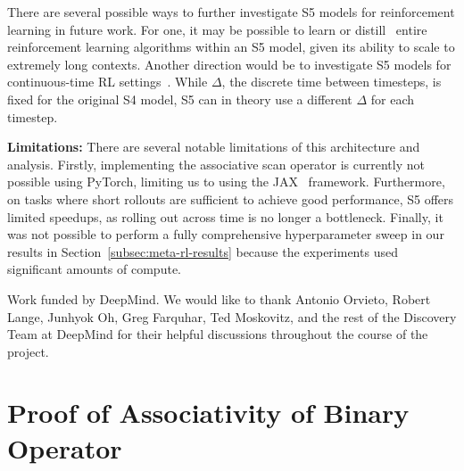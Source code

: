 \documentclass{article}
\begin{document}
There are several possible ways to further investigate S5 models for reinforcement learning in future work. For one, it may be possible to learn or distill~\citep{laskin2022context} entire reinforcement learning algorithms within an S5 model, given its ability to scale to extremely long contexts. 
Another direction would be to investigate S5 models for continuous-time RL settings~\citep{doya2000reinforcement}. While $\Delta$, the discrete time between timesteps, is fixed for the original S4 model, S5 can in theory use a different $\Delta$ for each timestep. 

\textbf{Limitations:} There are several notable limitations of this architecture and analysis. Firstly, implementing the associative scan operator is currently not possible using PyTorch, limiting us to using the JAX~\cite{jax2018github} framework. Furthermore, on tasks where short rollouts are sufficient to achieve good performance, S5 offers limited speedups, as rolling out across time is no longer a bottleneck. Finally, it was not possible to perform a fully comprehensive hyperparameter sweep in our results in Section~\ref{subsec:meta-rl-results} because the experiments used significant amounts of compute.

\begin{ack}
Work funded by DeepMind. We would like to thank Antonio Orvieto, Robert Lange, Junhyok Oh, Greg Farquhar, Ted Moskovitz, and the rest of the Discovery Team at DeepMind for their helpful discussions throughout the course of the project. 
\end{ack}










\newpage
\appendix
\section{Proof of Associativity of Binary Operator}
\label{app:proof-assoc}
\end{document}
